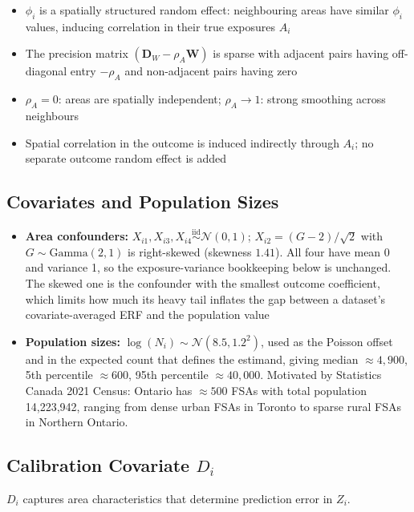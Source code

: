 \documentclass[11pt]{article}
\begin{document}
\begin{itemize}
\item $\phi_i$ is a spatially structured random effect: neighbouring areas have similar
$\phi_i$ values, inducing correlation in their true exposures $A_i$
\item The precision matrix $(\mathbf{D}_W - \rho_A\mathbf{W})$ is sparse with adjacent
pairs having off-diagonal entry $-\rho_A$ and non-adjacent pairs having zero
\item $\rho_A = 0$: areas are spatially independent;
$\rho_A \to 1$: strong smoothing across neighbours
\item Spatial correlation in the outcome is induced indirectly through $A_i$; no
separate outcome random effect is added
\end{itemize}

\subsection{Covariates and Population Sizes}

\begin{itemize}
\item \textbf{Area confounders:} $X_{i1}, X_{i3}, X_{i4} \overset{\text{iid}}{\sim} \mathcal{N}(0, 1)$;
$X_{i2} = (G - 2)/\sqrt{2}$ with $G \sim \text{Gamma}(2, 1)$ is right-skewed (skewness $1.41$). All four have
mean 0 and variance 1, so the exposure-variance bookkeeping below is unchanged. The skewed one is the
confounder with the smallest outcome coefficient, which limits how much its heavy tail inflates the gap
between a dataset's covariate-averaged ERF and the population value
\item \textbf{Population sizes:} $\log(N_i) \sim \mathcal{N}(8.5, 1.2^2)$, used as the Poisson offset and
in the expected count that defines the estimand, giving
median $\approx 4{,}900$, 5th percentile $\approx 600$, 95th percentile $\approx 40{,}000$.
Motivated by Statistics Canada 2021 Census: Ontario has $\approx 500$ FSAs with total
population 14,223,942, ranging from dense urban FSAs in Toronto to sparse rural FSAs in
Northern Ontario.
\end{itemize}

\subsection{Calibration Covariate $D_i$}

$D_i$ captures area characteristics that determine prediction error in $Z_i$.
\end{document}
